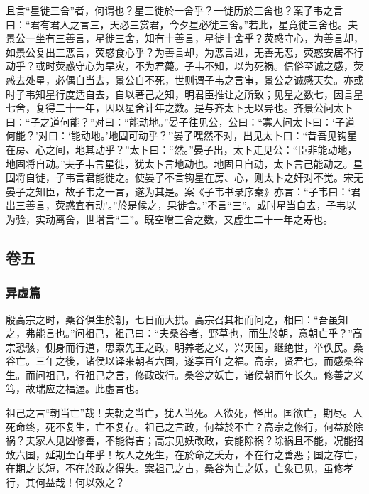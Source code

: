 \documentclass[]{article}
\begin{document}
且言``星徙三舍''者，何谓也？星三徙於一舍乎？一徙历於三舍也？案子韦之言曰：``君有君人之言三，天必三赏君，今夕星必徙三舍。''若此，星竟徙三舍也。夫景公一坐有三善言，星徙三舍，知有十善言，星徙十舍乎？荧惑守心，为善言却，如景公复出三恶言，荧惑食心乎？为善言却，为恶言进，无善无恶，荧惑安居不行动乎？或时荧惑守心为旱灾，不为君薨。子韦不知，以为死祸。信俗至诚之感，荧惑去处星，必偶自当去，景公自不死，世则谓子韦之言审，景公之诚感天矣。亦或时子韦知星行度适自去，自以著己之知，明君臣推让之所致；见星之数七，因言星七舍，复得二十一年，因以星舍计年之数。是与齐太卜无以异也。齐景公问太卜曰：``子之道何能？''对曰：``能动地。''晏子往见公，公曰：``寡人问太卜曰：`子道何能？'对曰：`能动地。'地固可动乎？''晏子嘿然不对，出见太卜曰：``昔吾见钩星在房、心之间，地其动乎？''太卜曰：``然。''晏子出，太卜走见公：``臣非能动地，地固将自动。''夫子韦言星徙，犹太卜言地动也。地固且自动，太卜言己能动之。星固将自徙，子韦言君能徙之。使晏子不言钩星在房、心，则太卜之奸对不觉。宋无晏子之知臣，故子韦之一言，遂为其是。案《子韦书录序秦》亦言：``子韦曰：`君出三善言，荧惑宜有动'。''於是候之，果徙舍。''不言``三''。或时星当自去，子韦以为验，实动离舍，世增言``三''。既空增三舍之数，又虚生二十一年之寿也。

\hypertarget{header-n177}{%
\subsection{卷五}\label{header-n177}}

\hypertarget{header-n178}{%
\subsubsection{异虚篇}\label{header-n178}}

殷高宗之时，桑谷俱生於朝，七日而大拱。高宗召其相而问之，相曰：``吾虽知之，弗能言也。''问祖己，祖己曰：``夫桑谷者，野草也，而生於朝，意朝亡乎？''高宗恐骇，侧身而行道，思索先王之政，明养老之义，兴灭国，继绝世，举佚民。桑谷亡。三年之後，诸侯以译来朝者六国，遂享百年之福。高宗，贤君也，而感桑谷生。而问祖己，行祖己之言，修政改行。桑谷之妖亡，诸侯朝而年长久。修善之义笃，故瑞应之福渥。此虚言也。

祖己之言``朝当亡''哉！夫朝之当亡，犹人当死。人欲死，怪出。国欲亡，期尽。人死命终，死不复生，亡不复存。祖己之言政，何益於不亡？高宗之修行，何益於除祸？夫家人见凶修善，不能得吉；高宗见妖改政，安能除祸？除祸且不能，况能招致六国，延期至百年乎！故人之死生，在於命之夭寿，不在行之善恶；国之存亡，在期之长短，不在於政之得失。案祖己之占，桑谷为亡之妖，亡象已见，虽修孝行，其何益哉！何以效之？
\end{document}
